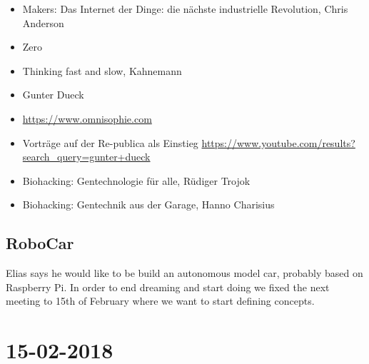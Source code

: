 \documentclass[]{book}
\providecommand{\tightlist}{%
  \setlength{\itemsep}{0pt}\setlength{\parskip}{0pt}}
\begin{document}
\begin{itemize}
\tightlist
\item
  Makers: Das Internet der Dinge: die nächste industrielle Revolution,
  Chris Anderson
\item
  Zero
\item
  Thinking fast and slow, Kahnemann
\item
  Gunter Dueck
\item
  \url{https://www.omnisophie.com}\\
\item
  Vorträge auf der Re-publica als Einstieg
  \url{https://www.youtube.com/results?search_query=gunter+dueck}
\item
  Biohacking: Gentechnologie für alle, Rüdiger Trojok
\item
  Biohacking: Gentechnik aus der Garage, Hanno Charisius
\end{itemize}

\subsection{RoboCar}\label{robocar}

Elias says he would like to be build an autonomous model car, probably
based on Raspberry Pi. In order to end dreaming and start doing we fixed
the next meeting to 15th of February where we want to start defining
concepts.

\section{15-02-2018}\label{section-1}


\end{document}
